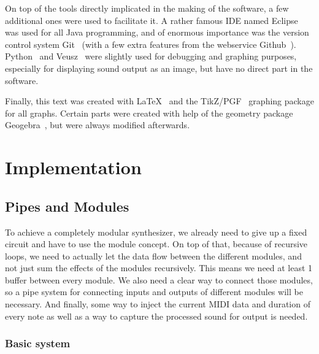 \documentclass[11pt,a4paper]{article}
\begin{document}
On top of the tools directly implicated in the making of the software, a few additional ones were used to fac‎ilitate it. A rather famous IDE named Eclipse~\cite{Eclipse} was used for all Java programming, and of enormous importance was the version control system Git~\cite{Git} (with a few extra features from the webservice Github~\cite{Github}). Python~\cite{Python} and Veusz~\cite{Veusz} were slightly used for debugging and graphing purposes, especially for displaying sound output as an image, but have no direct part in the software.

Finally, this text was created with LaTeX~\cite{Latex} and the TikZ/PGF~\cite{Tikz} graphing package for all graphs. Certain parts were created with help of the geometry package Geogebra~\cite{Geogebra}, but were always modified afterwards.

\section{Implementation}

\subsection{Pipes and Modules}

To achieve a completely modular synthesizer, we already need to give up a fixed circuit and have to use the module concept. On top of that, because of recursive loops, we need to actually let the data flow between the different modules, and not just sum the effects of the modules recursively. This means we need at least 1 buffer between every module. We also need a clear way to connect those modules, so a pipe system for connecting inputs and outputs of different modules will be necessary. And finally, some way to inject the current MIDI data and duration of every note as well as a way to capture the processed sound for output is needed.

\subsubsection{Basic system}
\end{document}
